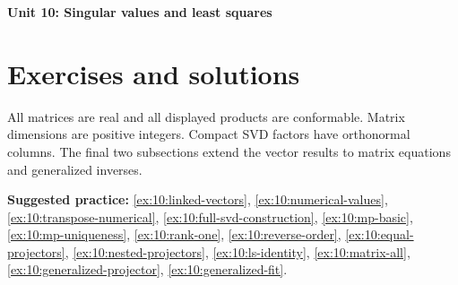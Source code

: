 \documentclass[12pt]{article}
\begin{document}
\begin{center}
{\Large\bfseries Unit 10: Singular values and least squares}
\end{center}

\clearpage
\section*{Exercises and solutions}
All matrices are real and all displayed products are conformable. Matrix dimensions are positive integers. Compact SVD factors have orthonormal columns. The final two subsections extend the vector results to matrix equations and generalized inverses.

\textbf{Suggested practice:} \ref{ex:10:linked-vectors}, \ref{ex:10:numerical-values}, \ref{ex:10:transpose-numerical}, \ref{ex:10:full-svd-construction}, \ref{ex:10:mp-basic}, \ref{ex:10:mp-uniqueness}, \ref{ex:10:rank-one}, \ref{ex:10:reverse-order}, \ref{ex:10:equal-projectors}, \ref{ex:10:nested-projectors}, \ref{ex:10:ls-identity}, \ref{ex:10:matrix-all}, \ref{ex:10:generalized-projector}, \ref{ex:10:generalized-fit}.

\end{document}
